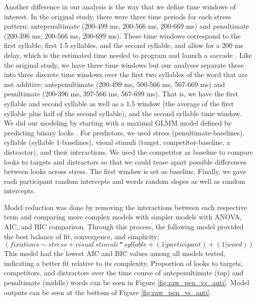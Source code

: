 Another difference in our analysis is the way that we define time windows of interest. In the original study, there were three time periods for each stress pattern: antepenultimate (200-499 ms, 200-566 ms, 200-669 ms) and penultimate (200-396 ms, 200-566 ms, 200-699 ms). These time windows correspond to the first syllable, first 1.5 syllables, and the second syllable, and allow for a 200 ms delay, which is the estimated time needed to program and launch a saccade \citep{Matin_Shao_Boff_1993}. Like the original study, we have three time windows but our analyses separate these into three discrete time windows over the first two syllables of the word that are not additive: antepenultimate (200-499 ms, 500-566 ms, 567-669 ms) and penultimate (200-396 ms, 397-566 ms, 567-699 ms). That is, we have the first syllable and second syllable as well as a 1.5 window (the average of the first syllable plus half of the second syllable), and the second syllable time window. We did our modeling by starting with a maximal GLMM model defined by predicting binary looks \citep{Barr_2008}. For predictors, we used stress (penultimate-baselines), syllable (syllable 1-baselines), visual stimuli (target, competitor-baseline, a distractor), and their interactions. We used the competitor as baseline to compare looks to targets and distractors so that we could tease apart possible differences between looks across stress. The first window is set as baseline. Finally, we gave each participant random intercepts and words random slopes as well as random intercepts.

Model reduction was done by removing the interactions between each respective term and comparing more complex models with simpler models with ANOVA, AIC, and BIC comparison. Through this process, the following model provided the best balance of fit, convergence, and simplicity: $$(fixations \sim stress + visual\ stimuli * syllable + (1|participant)+(1|word))$$  This model had the lowest AIC and BIC values among all models tested, indicating a better fit relative to its complexity. Proportion of looks to targets, competitors, and distractors over the time course of antepenultimate (top) and  penultimate (middle) words can be seen in Figure \ref{fig:raw_pen_vs_anti}. Model outputs can be seen at the bottom of Figure \ref{fig:raw_pen_vs_anti}.

